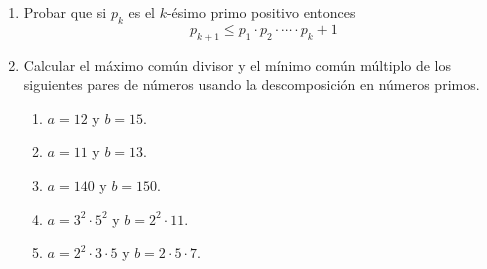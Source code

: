 \documentclass[12pt,spanish,makeidx]{amsbook}
\begin{document}
\begin{enumerate}
\smallskip

\item Probar que si $p_k$ es el $k$-ésimo primo positivo entonces
$$p_{k+1}\leq p_1\cdot p_2\cdot \cdots \cdot p_k+1$$

\smallskip


\item Calcular el máximo común divisor y el mínimo común múltiplo de los siguientes pares de números usando la descomposición en números primos. 
\begin{multicols}{3}
	\begin{enumerate}
		\item $a=12$ y $b=15$. 
		\item$a=11$ y $b=13$.
		\item $a=140$ y $b=150$.
		\item $a=3^2 \cdot 5^2$ y $b=2^2 \cdot 11$.
		\item $a=2^2 \cdot 3\cdot 5$ y $b=2\cdot 5\cdot 7$.
	\end{enumerate}
\end{multicols}


\end{enumerate}
\end{document}
